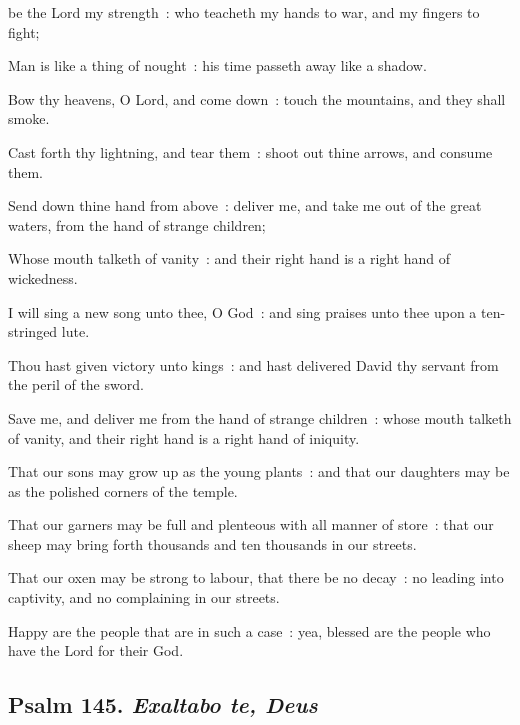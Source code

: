  be the Lord my strength~: who teacheth my hands to war, and my fingers to fight;\par
{}
Man is like a thing of nought~: his time passeth away like a shadow.\par
{}Bow thy heavens, O Lord, and come down~: touch the mountains, and they shall smoke.\par
{}Cast forth thy lightning, and tear them~: shoot out thine arrows, and consume them.\par
{}Send down thine hand from above~: deliver me, and take me out of the great waters, from the hand of strange children;\par
{}Whose mouth talketh of vanity~: and their right hand is a right hand of wickedness.\par
{}I will sing a new song unto thee, O God~: and sing praises unto thee upon a ten-stringed lute.\par
{}Thou hast given victory unto kings~: and hast delivered David thy servant from the peril of the sword.\par
{}Save me, and deliver me from the hand of strange children~: whose mouth talketh of vanity, and their right hand is a right hand of iniquity.\par
{}That our sons may grow up as the young plants~: and that our daughters may be as the polished corners of the temple.\par
{}That our garners may be full and plenteous with all manner of store~: that our sheep may bring forth thousands and ten thousands in our streets.\par
{}That our oxen may be strong to labour, that there be no decay~: no leading into captivity, and no complaining in our streets.\par
{}Happy are the people that are in such a case~: yea, blessed are the people who have the Lord for their God.\par

\subsection{Psalm 145. \textit{Exaltabo te, Deus}}


